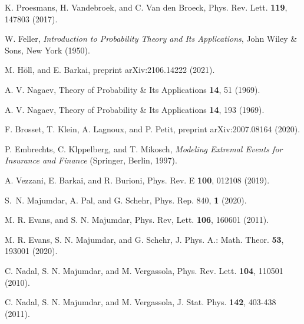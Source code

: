 \documentclass[aps,pre,twocolumn,superscriptaddress,showpacs]{revtex4-1}
\begin{document}
\begin{thebibliography}{10}
 K. Proesmans, H. Vandebroek, and C. Van den Broeck, Phys. Rev. Lett. {\bf 119}, 147803 (2017).



 W. Feller, \emph{Introduction to Probability Theory and Its Applications}, John Wiley \& Sons, New York (1950).

 M. H\"oll, and E. Barkai, preprint arXiv:2106.14222 (2021).

 A. V. Nagaev, Theory of Probability \& Its Applications {\bf 14}, 51 (1969).

 A. V. Nagaev, Theory of Probability \& Its Applications {\bf 14}, 193 (1969).

 F. Brosset, T. Klein, A. Lagnoux, and P. Petit, preprint arXiv:2007.08164 (2020).

 P. Embrechts, C. Klppelberg, and T. Mikosch, {\em Modeling Extremal Events for Insurance and Finance} (Springer, Berlin, 1997).

 A. Vezzani, E. Barkai, and R. Burioni, Phys. Rev. E {\bf 100}, 012108 (2019).

 S.~N. Majumdar, A. Pal, and G. Schehr, Phys. Rep. 840, {\bf 1} (2020).



 M. R. Evans, and S. N. Majumdar, Phys. Rev, Lett. {\bf 106}, 160601 (2011).

 M. R. Evans, S. N. Majumdar, and G. Schehr, J. Phys. A.: Math. Theor. {\bf 53}, 193001 (2020).

 C. Nadal, S. N. Majumdar, and M. Vergassola, Phys. Rev. Lett. {\bf 104}, 110501 (2010).

 C. Nadal, S. N. Majumdar, and M. Vergassola, J. Stat. Phys. {\bf 142}, 403-438 (2011).

\end{thebibliography}
\end{document}

